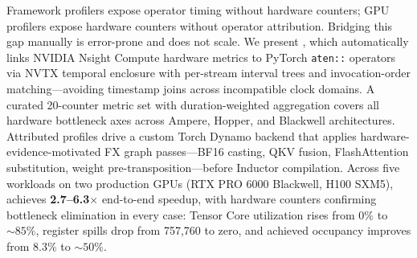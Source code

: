Framework profilers expose operator timing without hardware counters; GPU profilers expose hardware
counters without operator attribution. Bridging this gap manually is error-prone and does not scale.
We present \textbf{\sys}, which automatically links NVIDIA Nsight Compute hardware metrics to
PyTorch \texttt{aten::} operators via NVTX temporal enclosure with per-stream interval trees and
invocation-order matching---avoiding timestamp joins across incompatible clock domains. A curated
20-counter metric set with duration-weighted aggregation covers all hardware bottleneck axes across
Ampere, Hopper, and Blackwell architectures. Attributed profiles drive a custom Torch Dynamo backend
that applies hardware-evidence-motivated FX graph passes---BF16 casting, QKV fusion, FlashAttention
substitution, weight pre-transposition---before Inductor compilation. Across five workloads on two
production GPUs (RTX PRO 6000 Blackwell, H100 SXM5), \sys achieves \textbf{2.7--6.3$\times$}
end-to-end speedup, with hardware counters confirming bottleneck elimination in every case: Tensor
Core utilization rises from 0\% to ${\sim}85\%$, register spills drop from 757,760 to zero, and
achieved occupancy improves from 8.3\% to ${\sim}50\%$.
